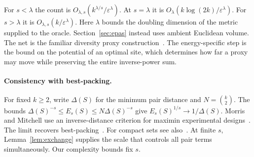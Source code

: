 \documentclass[a4paper,12pt]{article}
\numberwithin{equation}{section}
\begin{document}
For $s<\lambda$ the count is $O_{\lambda,s}(k^{\lambda/s}/\varepsilon^\lambda)$.
At $s=\lambda$ it is $O_\lambda(k\log(2k)/\varepsilon^\lambda)$.
For $s>\lambda$ it is $O_{\lambda,s}(k/\varepsilon^\lambda)$.
Here $\lambda$ bounds the doubling
dimension of the metric supplied to the oracle. Section~\ref{sec:epas} instead
uses ambient Euclidean volume. The net is the familiar diversity proxy
construction~\cite[Section 5]{ceccarello2017}. The energy-specific step is the
bound on the potential of an optimal site, which determines how far a proxy
may move while preserving the entire inverse-power sum.

\paragraph*{Consistency with best-packing.}
For fixed $k\ge2$, write $\Delta(S)$ for the minimum pair distance and $N=\binom{k}{2}$.
The bounds $\Delta(S)^{-s}\le E_s(S)\le N\Delta(S)^{-s}$ give
$E_s(S)^{1/s}\to1/\Delta(S)$. Morris and Mitchell use an inverse-distance
criterion for maximin experimental designs~\cite{morris1995}. The limit
recovers best-packing~\cite[Proposition 1]{metric2026}.
For compact sets see also~\cite[Proposition 2]{bondarenko}.
At finite $s$, Lemma~\ref{lem:exchange} supplies the scale that controls all
pair terms simultaneously. Our complexity bounds fix $s$.
\end{document}
